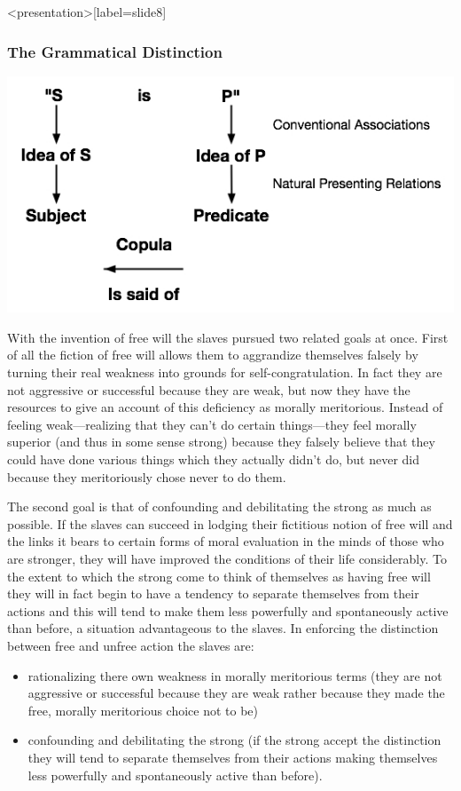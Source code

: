 \begin{frame}<presentation>[label=slide8]
    \frametitle{The Grammatical Distinction}
        \includegraphics[width=\textwidth]{../../graphics/subject_predicate.jpg}
\end{frame}

With the invention of free will the slaves pursued two related goals at once. First of all the fiction of free will allows them to aggrandize themselves falsely by turning their real weakness into grounds for self-congratulation. In fact they are not aggressive or successful because they are weak, but now they have the resources to give an account of this deficiency as morally meritorious. Instead of feeling weak---realizing that they can't do certain things---they feel morally superior (and thus in some sense strong) because they falsely believe that they could have done various things which they actually didn't do, but never did because they meritoriously chose never to do them.

The second goal is that of confounding and debilitating the strong as much as possible. If the slaves can succeed in lodging their fictitious notion of free will and the links it bears to certain forms of moral evaluation in the minds of those who are stronger, they will have improved the conditions of their life considerably. To the extent to which the strong come to think of themselves as having free will they will in fact begin to have a tendency to separate themselves from their actions and this will tend to make them less powerfully and spontaneously active than before, a situation advantageous to the slaves. In enforcing the distinction between free and unfree action the slaves are: 
\begin{itemize}
	\item rationalizing there own weakness in morally meritorious terms (they are not aggressive or successful because they are weak rather because they made the free, morally meritorious choice not to be)
	\item confounding and debilitating the strong (if the strong accept the distinction they will tend to separate themselves from their actions making themselves less powerfully and spontaneously active than before).
\end{itemize}

